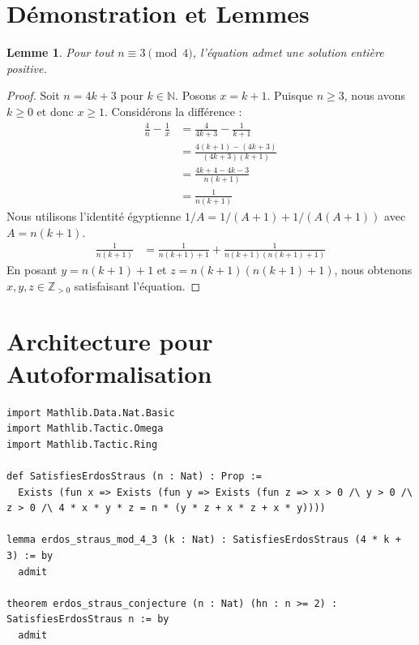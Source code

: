 \documentclass[12pt, a4paper]{article}
\newtheorem{lemma}[theorem]{Lemme}
\begin{document}
\section{Démonstration et Lemmes}
\begin{lemma}
Pour tout $n \equiv 3 \pmod 4$, l'équation admet une solution entière positive.
\end{lemma}
\begin{proof}
Soit $n = 4k+3$ pour $k \in \mathbb{N}$. Posons $x = k+1$. Puisque $n \geq 3$, nous avons $k \geq 0$ et donc $x \geq 1$. Considérons la différence :
\begin{align*}
\frac{4}{n} - \frac{1}{x} &= \frac{4}{4k+3} - \frac{1}{k+1} \\
&= \frac{4(k+1) - (4k+3)}{(4k+3)(k+1)} \\
&= \frac{4k+4 - 4k - 3}{n(k+1)} \\
&= \frac{1}{n(k+1)}
\end{align*}
Nous utilisons l'identité égyptienne $1/A = 1/(A+1) + 1/(A(A+1))$ avec $A = n(k+1)$.
\begin{align*}
\frac{1}{n(k+1)} &= \frac{1}{n(k+1) + 1} + \frac{1}{n(k+1)(n(k+1) + 1)}
\end{align*}
En posant $y = n(k+1)+1$ et $z = n(k+1)(n(k+1)+1)$, nous obtenons $x,y,z \in \mathbb{Z}_{>0}$ satisfaisant l'équation.
\end{proof}

\section{Architecture pour Autoformalisation}
\begin{lstlisting}[basicstyle=\ttfamily\small, breaklines=true]
import Mathlib.Data.Nat.Basic
import Mathlib.Tactic.Omega
import Mathlib.Tactic.Ring

def SatisfiesErdosStraus (n : Nat) : Prop :=
  Exists (fun x => Exists (fun y => Exists (fun z => x > 0 /\ y > 0 /\ z > 0 /\ 4 * x * y * z = n * (y * z + x * z + x * y))))

lemma erdos_straus_mod_4_3 (k : Nat) : SatisfiesErdosStraus (4 * k + 3) := by
  admit

theorem erdos_straus_conjecture (n : Nat) (hn : n >= 2) : SatisfiesErdosStraus n := by
  admit
\end{lstlisting}
\end{document}
